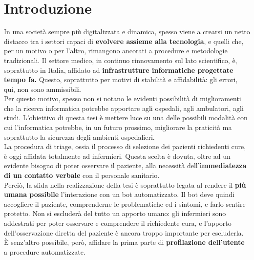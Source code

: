 \chapter{Introduzione}
\label{chap:introduzione}
In una società sempre più digitalizzata e dinamica, spesso viene a crearsi un netto distacco tra i settori capaci di \textbf{evolvere assieme alla tecnologia}, e quelli che, per un motivo o per l'altro, rimangono ancorati a procedure e metodologie tradizionali. Il settore medico, in continuo rinnovamento sul lato scientifico, è, soprattutto in Italia, affidato ad \textbf{infrastrutture informatiche progettate tempo fa.} Questo, soprattutto per motivi di stabilità e affidabilità: gli errori, qui, non sono ammissibili. \\
Per questo motivo, spesso non si notano le evidenti possibilità di miglioramenti che la ricerca informatica potrebbe apportare agli ospedali, agli ambulatori, agli studi.
L'obiettivo di questa tesi è mettere luce su una delle possibili modalità con cui l'informatica potrebbe, in un futuro prossimo, migliorare la praticità ma soprattutto la sicurezza degli ambienti ospedalieri.\\
La procedura di triage, ossia il processo di selezione dei pazienti richiedenti cure, è oggi affidata totalmente ad infermieri. Questa scelta è dovuta, oltre ad un evidente bisogno di poter osservare il paziente, alla necessità dell'\textbf{immediatezza di un contatto verbale} con il personale sanitario. \\
Perciò, la sfida nella realizzazione della tesi è soprattutto legata al rendere il \textbf{più umana possibile} l'interazione con un bot automatizzato. Il bot deve quindi accogliere il paziente, comprenderne le problematiche ed i sintomi, e farlo sentire protetto. Non si escluderà del tutto un apporto umano: gli infermieri sono addestrati per poter osservare e comprendere il richiedente cura, e l'apporto dell'osservazione diretta del paziente è ancora troppo importante per escluderla. È senz'altro possibile, però, affidare la prima parte di \textbf{profilazione dell'utente} a procedure automatizzate.
